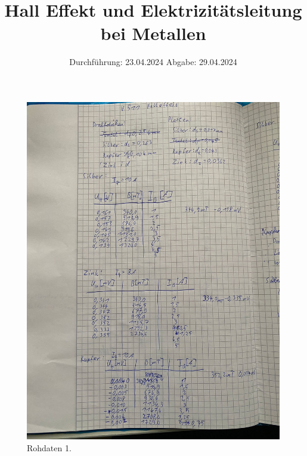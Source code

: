 

\subject{V511}
\title{Hall Effekt und Elektrizitätsleitung bei Metallen}
\date{%
  Durchführung: 23.04.2024
  \hspace{3em}
  Abgabe: 29.04.2024
}



\maketitle
\thispagestyle{empty}
\tableofcontents
\newpage






\newpage

\printbibliography{}

\newpage

\begin{figure}[H]
  \includegraphics[width=\textwidth, height=15cm]{Bilder/data1.jpg}
  \caption{Rohdaten 1.}
\end{figure}


